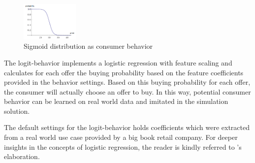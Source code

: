 %
\begin{figure}[h]
    \centering
    \includegraphics[width=0.25\textwidth]{images/sigmoid.png}
    \caption{Sigmoid distribution as consumer behavior}
    \label{fig:sigmoid_distribution}
\end{figure}
%

The logit-behavior implements a logistic regression with feature scaling and calculates for each offer the buying probability based on the feature coefficients provided in the behavior settings. Based on this buying probability for each offer, the consumer will actually choose an offer to buy. In this way, potential consumer behavior can be learned on real world data and imitated in the simulation solution.

The default settings for the logit-behavior holds coefficients which were extracted from a real world use case provided by a big book retail company. For deeper insights in the concepts of logistic regression, the reader is kindly referred to \citet{hosmer2013applied}'s elaboration.

%
